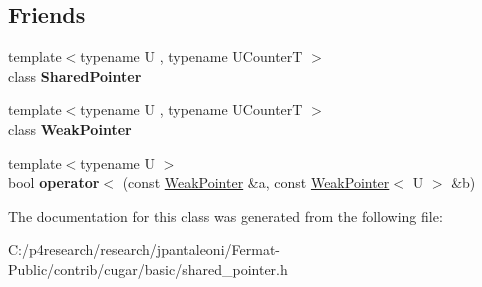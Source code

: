 \subsection*{Friends}
\begin{DoxyCompactItemize}
\item 
\mbox{\label{classcugar_1_1_weak_pointer_a59e9c78b2bbf73f285138119bff21311}} 
{\footnotesize template$<$typename U , typename U\+CounterT $>$ }\\class {\bfseries Shared\+Pointer}
\item 
\mbox{\label{classcugar_1_1_weak_pointer_a43397458ccacac480f107a9680e1e7dd}} 
{\footnotesize template$<$typename U , typename U\+CounterT $>$ }\\class {\bfseries Weak\+Pointer}
\item 
\mbox{\label{classcugar_1_1_weak_pointer_a7d43c9c0e2a633c8dce6d25113423964}} 
{\footnotesize template$<$typename U $>$ }\\bool {\bfseries operator$<$} (const \hyperlink{classcugar_1_1_weak_pointer}{Weak\+Pointer} \&a, const \hyperlink{classcugar_1_1_weak_pointer}{Weak\+Pointer}$<$ U $>$ \&b)
\end{DoxyCompactItemize}


The documentation for this class was generated from the following file\+:\begin{DoxyCompactItemize}
\item 
C\+:/p4research/research/jpantaleoni/\+Fermat-\/\+Public/contrib/cugar/basic/shared\+\_\+pointer.\+h\end{DoxyCompactItemize}
